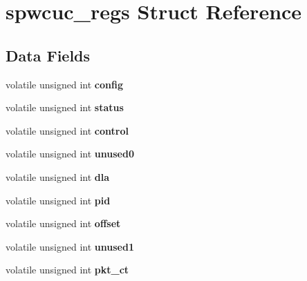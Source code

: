 \hypertarget{structspwcuc__regs}{}\section{spwcuc\+\_\+regs Struct Reference}
\label{structspwcuc__regs}
\subsection*{Data Fields}
\begin{DoxyCompactItemize}
\item 
\mbox{\label{structspwcuc__regs_a6fc047a1c910d5477d42849f617c4edf}} 
volatile unsigned int {\bfseries config}
\item 
\mbox{\label{structspwcuc__regs_a559ab7b228e0262b6c83f438519dc4f6}} 
volatile unsigned int {\bfseries status}
\item 
\mbox{\label{structspwcuc__regs_af5f7f55ac8c33a8c5291fa3629002e82}} 
volatile unsigned int {\bfseries control}
\item 
\mbox{\label{structspwcuc__regs_ac4ea695702da6264dcc8209478d94e14}} 
volatile unsigned int {\bfseries unused0}
\item 
\mbox{\label{structspwcuc__regs_a6e6379234fecb999458b73c5d7905b6e}} 
volatile unsigned int {\bfseries dla}
\item 
\mbox{\label{structspwcuc__regs_a58848cdf133d6e7ebfc96e3cf7cf04fb}} 
volatile unsigned int {\bfseries pid}
\item 
\mbox{\label{structspwcuc__regs_a7a4b4e5a1d803040ec448abe05afe80d}} 
volatile unsigned int {\bfseries offset}
\item 
\mbox{\label{structspwcuc__regs_a636abb841438c2ea033514c663d39946}} 
volatile unsigned int {\bfseries unused1}
\item 
\mbox{\label{structspwcuc__regs_a2bbb6ab2c7c79c1c60144111e7dc376d}} 
volatile unsigned int {\bfseries pkt\+\_\+ct}
\item 

\end{DoxyCompactItemize}
